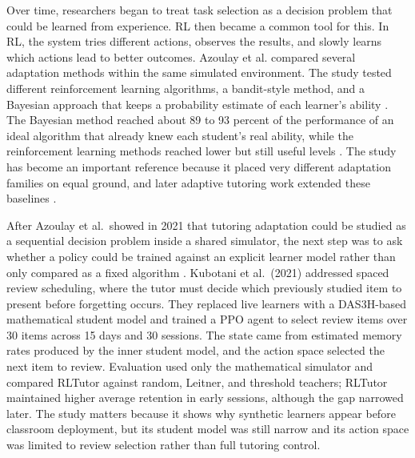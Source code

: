Over time, researchers began to treat task selection as a decision problem that could be learned from experience. \ac{RL} then became a common tool for this. In \ac{RL}, the system tries different actions, observes the results, and slowly learns which actions lead to better outcomes. Azoulay et al. compared several adaptation methods within the same simulated environment. The study tested different reinforcement learning algorithms, a bandit-style method, and a Bayesian approach that keeps a probability estimate of each learner's ability \cite{azoulay_adaptive_2021}. The Bayesian method reached about 89 to 93 percent of the performance of an ideal algorithm that already knew each student's real ability, while the reinforcement learning methods reached lower but still useful levels \cite{azoulay_adaptive_2021}. The study has become an important reference because it placed very different adaptation families on equal ground, and later adaptive tutoring work extended these baselines \cite{kubotani_rltutor_2021,fu_integrating_2025}.

After Azoulay et al.\ showed in 2021 that tutoring adaptation could be studied as a sequential decision problem inside a shared simulator, the next step was to ask whether a policy could be trained against an explicit learner model rather than only compared as a fixed algorithm \cite{azoulay_adaptive_2021,kubotani_rltutor_2021}. Kubotani et al.\ (2021) addressed spaced review scheduling, where the tutor must decide which previously studied item to present before forgetting occurs. They replaced live learners with a DAS3H-based mathematical student model and trained a \ac{PPO} agent to select review items over 30 items across 15 days and 30 sessions. The state came from estimated memory rates produced by the inner student model, and the action space selected the next item to review. Evaluation used only the mathematical simulator and compared RLTutor against random, Leitner, and threshold teachers; RLTutor maintained higher average retention in early sessions, although the gap narrowed later. The study matters because it shows why synthetic learners appear before classroom deployment, but its student model was still narrow and its action space was limited to review selection rather than full tutoring control.

